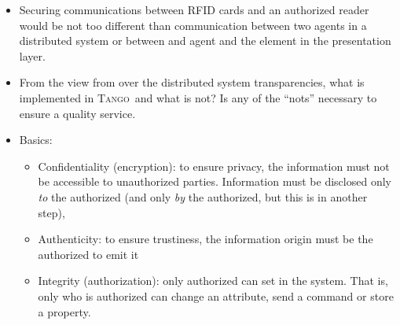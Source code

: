 \documentclass[10pt,a4paper,twoside]{llncs}
\newcommand{\tango}{\textsc{Tango}}
\begin{document}
\begin{itemize}
 \item Securing communications between RFID cards and an authorized reader \cite{Santi11} would be not too different than communication between two agents in a distributed system or between and agent and the element in the presentation layer.
 \item From the view from \cite{TanenbaumDistr} over the distributed system transparencies, what is implemented in \tango\, and what is not? Is any of the ``nots'' necessary to ensure a quality service.
  \begin{table}
  \end{table}
 \item Basics:
 \begin{itemize}
  \item Confidentiality (encryption): to ensure privacy, the information must not be accessible to unauthorized parties. Information must be disclosed only \emph{to} the authorized (and only \emph{by} the authorized, but this is in another step),
  \item Authenticity: to ensure trustiness, the information origin must be the authorized to emit it
  \item Integrity (authorization): only authorized can set in the system. That is, only who is authorized can change an attribute, send a command or store a property.

\end{itemize}
\end{itemize}
\end{document}
